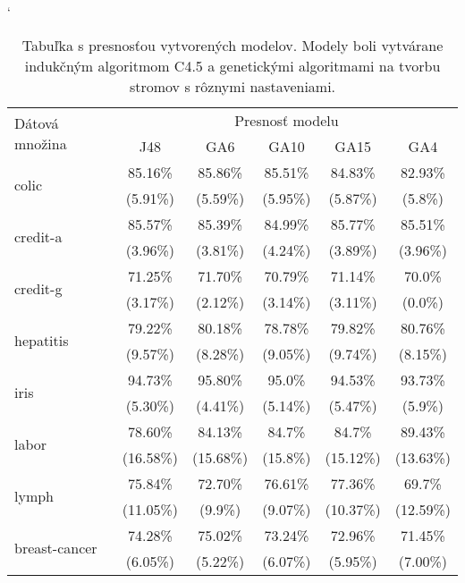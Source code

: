 \begin{table}[t]
\catcode`
\centering 
\newcommand\T{\rule{0pt}{2.6ex}}       %
\newcommand\B{\rule[-1.2ex]{0pt}{0pt}} %
\begin{tabular}{|l||c|c|c|c|c||}
\hline \multirow{2}{*}{Dátová množina} & \multicolumn{5}{|c||}{Presnosť modelu} \\ 
\cline{2-6} & J48 & GA6 & GA10 & GA15 & GA4 \\
\hline
\hline \multirow{2}{*}{colic} & 85.16\% & 85.86\% & 85.51\% & 84.83\% & 82.93\% \T\\[-1.5ex]
& \tiny (5.91\%) & \tiny (5.59\%) & \tiny (5.95\%) & \tiny (5.87\%) & \tiny (5.8\%)\B\\
\hline \multirow{2}{*}{credit-a} & 85.57\% & 85.39\% & 84.99\% & 85.77\% & 85.51\% \T\\[-1.5ex]
& \tiny (3.96\%) & \tiny (3.81\%) & \tiny (4.24\%) & \tiny (3.89\%) & \tiny (3.96\%)\B\\
\hline \multirow{2}{*}{credit-g} & 71.25\% & 71.70\% & 70.79\% & 71.14\% & 70.0\%\T\\[-1.5ex]
& \tiny (3.17\%) & \tiny (2.12\%) & \tiny (3.14\%) & \tiny (3.11\%) & \tiny (0.0\%)\B\\
\hline \multirow{2}{*}{hepatitis} & 79.22\% & 80.18\% & 78.78\% & 79.82\% & 80.76\% \T\\[-1.5ex]
& \tiny (9.57\%) & \tiny (8.28\%) & \tiny (9.05\%) & \tiny (9.74\%) & \tiny (8.15\%)\B\\
\hline \multirow{2}{*}{iris} & 94.73\% & 95.80\% & 95.0\% & 94.53\% & 93.73\% \T\\[-1.5ex]
& \tiny (5.30\%) & \tiny (4.41\%) & \tiny (5.14\%) & \tiny (5.47\%) & \tiny (5.9\%)\B\\
\hline \multirow{2}{*}{labor} & 78.60\% & 84.13\% & 84.7\% & 84.7\% & 89.43\% \T\\[-1.5ex]
& \tiny (16.58\%) & \tiny (15.68\%) & \tiny (15.8\%) & \tiny (15.12\%) & \tiny (13.63\%)\B\\
\hline \multirow{2}{*}{lymph} & 75.84\% & 72.70\% & 76.61\% & 77.36\% & 69.7\% \T\\[-1.5ex]
& \tiny (11.05\%) & \tiny (9.9\%) & \tiny (9.07\%) & \tiny (10.37\%) & \tiny (12.59\%)\B\\
\hline \multirow{2}{*}{breast-cancer} & 74.28\% & 75.02\% & 73.24\% & 72.96\% & 71.45\% \T\\[-1.5ex]
& \tiny (6.05\%) & \tiny (5.22\%) & \tiny (6.07\%) & \tiny (5.95\%) & \tiny (7.00\%)\B\\
\hline
\end{tabular}
\caption{Tabuľka s presnosťou vytvorených modelov. Modely boli vytvárane indukčným algoritmom C4.5 a genetickými algoritmami na tvorbu stromov s rôznymi nastaveniami. }\label{fig:acc}
\end{table}

